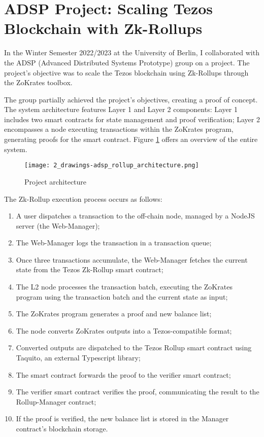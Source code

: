 \section{ADSP Project: Scaling Tezos Blockchain with Zk-Rollups \label{sec:2_adspProject}}

In the Winter Semester 2022/2023 at the University of Berlin, I collaborated with the ADSP (Advanced Distributed Systems Prototype) group on a project. The project's objective was to scale the Tezos blockchain using Zk-Rollups through the ZoKrates toolbox.

The group partially achieved the project's objectives, creating a proof of concept. The system architecture features Layer 1 and Layer 2 components: Layer 1 includes two smart contracts for state management and proof verification; Layer 2 encompasses a node executing transactions within the ZoKrates program, generating proofs for the smart contract. Figure \ref{fig:2_general_rollup_architecture} offers an overview of the entire system.

\begin{figure}[ht]
  \centering
  \texttt{[image: 2\_drawings-adsp\_rollup\_architecture.png]}
  \caption[Project Architecture]{Project architecture}  
  \label{fig:2_general_rollup_architecture}
\end{figure}

The Zk-Rollup execution process occurs as follows:
\begin{enumerate}
    \item A user dispatches a transaction to the off-chain node, managed by a NodeJS server (the Web-Manager);
    \item The Web-Manager logs the transaction in a transaction queue;
    \item Once three transactions accumulate, the Web-Manager fetches the current state from the Tezos Zk-Rollup smart contract;
    \item The L2 node processes the transaction batch, executing the ZoKrates program using the transaction batch and the current state as input;
    \item The ZoKrates program generates a proof and new balance list;
    \item The node converts ZoKrates outputs into a Tezos-compatible format;
    \item Converted outputs are dispatched to the Tezos Rollup smart contract using Taquito, an external Typescript library;
    \item The smart contract forwards the proof to the verifier smart contract;
    \item The verifier smart contract verifies the proof, communicating the result to the Rollup-Manager contract;
    \item If the proof is verified, the new balance list is stored in the Manager contract's blockchain storage.
\end{enumerate}

